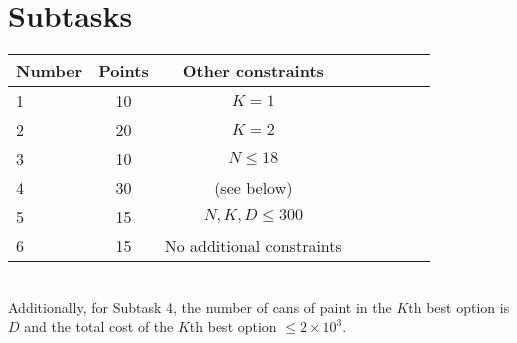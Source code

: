\documentclass{article}
\begin{document}
\section*{Subtasks}
\begin{tabular}{l*{6}{c}r}
Number & Points & Other constraints\\
\hline
1 & 10 & $K = 1$\\
2 & 20 & $K = 2$ \\
3 & 10 & $N \le 18$\\
4 & 30 & (see below)\\
5 & 15 & $N, K, D \le 300$ \\
6 & 15 & No additional constraints
\end{tabular} \\

Additionally, for Subtask 4, the number of cans of paint in the $K$th best option is $D$ and the total cost of the $K$th best option $\le 2\times 10^3$.
\end{document}
